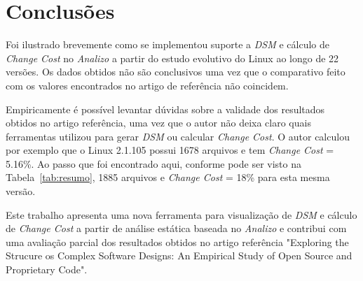 \documentclass[conference]{IEEEtran}
\begin{document}
\section{Conclusões}

Foi ilustrado brevemente como se implementou suporte a {\it DSM} e cálculo de
{\it Change Cost} no {\it Analizo} a partir do estudo evolutivo do Linux
ao longo de 22 versões. Os dados obtidos não são conclusivos uma vez
que o comparativo feito com os valores encontrados no artigo de
referência\cite{ExploringStructure} não coincidem.

Empiricamente é possível levantar dúvidas sobre a validade dos resultados
obtidos no artigo referência\cite{ExploringStructure}, uma vez que o autor não
deixa claro quais ferramentas utilizou para gerar {\it DSM} ou calcular {\it
Change Cost}. O autor calculou por exemplo que o Linux 2.1.105 possui 1678
arquivos e tem {\it Change Cost} = 5.16\%. Ao passo que foi encontrado aqui,
conforme pode ser visto na Tabela~\ref{tab:resumo}, 1885 arquivos e {\it
Change Cost} = 18\% para esta mesma versão.

Este trabalho apresenta uma nova ferramenta para visualização de {\it DSM} e
cálculo de {\it Change Cost} a partir de análise estática baseada no {\it
Analizo} e contribui com uma avaliação parcial dos resultados obtidos no
artigo referência "Exploring the Strucure os Complex Software Designs: An
Empirical Study of Open Source and Proprietary Code"\cite{ExploringStructure}.


\end{document}
